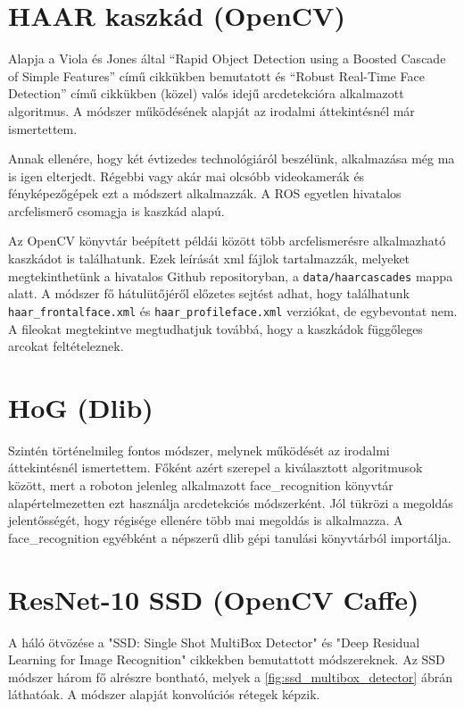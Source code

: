 \section{HAAR kaszkád (OpenCV)}
Alapja a Viola és Jones által “Rapid Object Detection using a Boosted Cascade of Simple Features”\cite{viola_rapid_2001} című cikkükben bemutatott és “Robust Real-Time Face Detection”\cite{viola_robust_2004} című cikkükben (közel) valós idejű arcdetekcióra alkalmazott algoritmus. A módszer működésének alapját az irodalmi áttekintésnél már ismertettem.

Annak ellenére, hogy két évtizedes technológiáról beszélünk, alkalmazása még ma is igen elterjedt. Régebbi vagy akár mai olcsóbb videokamerák és fényképezőgépek ezt a módszert alkalmazzák. A ROS egyetlen hivatalos arcfelismerő csomagja \cite{noauthor_face_detector_nodate} is kaszkád alapú.

Az OpenCV könyvtár beépített példái között több arcfelismerésre alkalmazható kaszkádot is találhatunk. Ezek leírását xml fájlok tartalmazzák, melyeket megtekinthetünk a hivatalos Github repositoryban\cite{noauthor_opencvopencv_2021}, a \lstinline{data/haarcascades} mappa alatt. A módszer fő hátulütőjéről előzetes sejtést adhat, hogy találhatunk \lstinline{haar_frontalface.xml} és \lstinline{haar_profileface.xml} verziókat, de egybevontat nem. A fileokat megtekintve megtudhatjuk továbbá, hogy a kaszkádok függőleges arcokat feltételeznek.

\section{HoG (Dlib)}

Szintén történelmileg fontos módszer, melynek működését az irodalmi áttekintésnél ismertettem. Főként azért szerepel a kiválasztott algoritmusok között, mert a roboton jelenleg alkalmazott face\_recognition könyvtár alapértelmezetten ezt használja arcdetekciós módszerként. Jól tükrözi a megoldás jelentősségét, hogy régisége ellenére több mai megoldás is alkalmazza. A face\_recognition egyébként a népszerű dlib gépi tanulási könyvtárból importálja.

\section{ResNet-10 SSD (OpenCV Caffe)}
A háló ötvözése a "SSD: Single Shot MultiBox Detector"\cite{liu_ssd_2016} és "Deep Residual Learning for Image Recognition"\cite{he_deep_2015} cikkekben bemutattott módszereknek. Az SSD módszer három fő alrészre bontható, melyek a
\ref{fig:ssd_multibox_detector}
ábrán láthatóak. A módszer alapját konvolúciós rétegek képzik.

